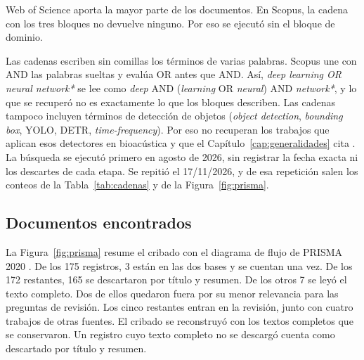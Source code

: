 Web of Science aporta la mayor parte de los documentos. En Scopus, la cadena con
los tres bloques no devuelve ninguno. Por eso se ejecutó sin el bloque de
dominio.

 Las cadenas escriben sin comillas los
términos de varias palabras. Scopus une con AND las palabras sueltas y evalúa OR
antes que AND. Así, \textit{deep learning OR neural network*} se lee como
\textit{deep} AND (\textit{learning} OR \textit{neural}) AND
\textit{network*}, y lo que se recuperó no es exactamente lo que los bloques
describen. Las cadenas tampoco incluyen términos de detección de objetos
(\textit{object detection}, \textit{bounding box}, YOLO, DETR,
\textit{time-frequency}). Por eso no recuperan los trabajos que aplican esos
detectores en bioacústica y que el Capítulo~\ref{cap:generalidades} cita
\citep{romero-mujalli_utilizing_2021,escobar-amado_computer_2024,airale_nbm_2025,hong_deep_2026}.
La búsqueda se ejecutó primero en agosto de 2026, sin registrar la fecha exacta ni
los descartes de cada etapa. Se repitió el 17/11/2026, y de esa repetición salen
los conteos de la Tabla~\ref{tab:cadenas} y de la Figura~\ref{fig:prisma}.

\subsection{Documentos encontrados}

La Figura~\ref{fig:prisma} resume el cribado con el diagrama de flujo de PRISMA
2020 \citep{page_prisma_2021}. De los 175 registros, 3 están en las dos bases y
se cuentan una vez. De los 172 restantes, 165 se descartaron por título y resumen.
De los otros 7 se leyó el texto completo. Dos de ellos quedaron fuera por su menor
relevancia para las preguntas de revisión. Los cinco restantes entran en la
revisión, junto con cuatro trabajos de otras fuentes. El cribado se reconstruyó
con los textos completos que se conservaron. Un registro cuyo texto completo no se
descargó cuenta como descartado por título y resumen.

